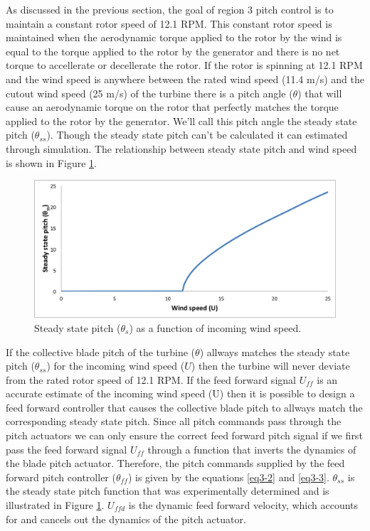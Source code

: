 As discussed in the previous section, the goal of region 3 pitch control is to maintain a constant rotor speed of 12.1 RPM. This constant rotor speed is maintained when the aerodynamic torque applied to the rotor by the wind is equal to the torque applied to the rotor by the generator and there is no net torque to accellerate or decellerate the rotor. If the rotor is spinning at 12.1 RPM and the wind speed is anywhere between the rated wind speed (11.4 m/s) and the cutout wind speed (25 m/s) of the turbine there is a pitch angle ($\theta$) that will cause an aerodynamic torque on the rotor that perfectly matches the torque applied to the rotor by the generator. We'll call this pitch angle the steady state pitch ($\theta_{ss}$). Though the steady state pitch can't be calculated it can estimated through simulation. The relationship between steady state pitch and wind speed is shown in Figure \ref{fig3-11}.

 \begin{figure}[htbp]
	\centering
		\includegraphics[width=\linewidth]{Figures/ch3Figures/fig3-11.png}
		
	\caption{Steady state pitch ($\theta_{s}$) as a function of incoming wind speed.}
	\label{fig3-11}
\end{figure}

If the collective blade pitch of the turbine ($\theta$) allways matches the steady state pitch ($\theta_{ss}$) for the incoming wind speed ($U$) then the turbine will never deviate from the rated rotor speed of 12.1 RPM. If the feed forward signal $U_{ff}$ is an accurate estimate of the incoming wind speed (U) then it is possible to design a feed forward controller that causes the collective blade pitch to allways match the corresponding steady state pitch. Since all pitch commands pass through the pitch actuators we can only ensure the correct feed forward pitch signal if we first pass the feed forward signal $U_{ff}$ through a function that inverts the dynamics of the blade pitch actuator. Therefore, the pitch commands supplied by the feed forward pitch controller ($\theta_{ff}$) is given by the equations \ref{eq3-2} and \ref{eq3-3}. $\theta_{ss}$ is the steady state pitch function that was experimentally determined and is illustrated in Figure \ref{fig3-11}. $U_{ffd}$ is the dynamic feed forward velocity, which accounts for and cancels out the dynamics of the pitch actuator.

